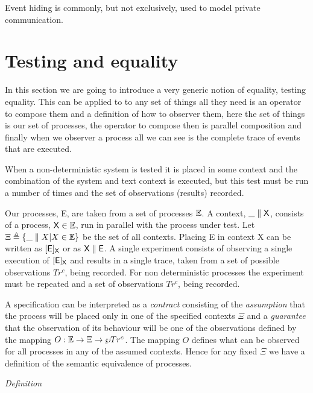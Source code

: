 \documentclass[]{article}
\begin{document}
Event hiding is commonly, but not exclusively,   used to model private  communication.

\section{Testing and equality}
In this section we are going to introduce  a very generic notion of equality, testing equality. This can be applied to to any set of things all they need is an operator to compose them and a definition of how to observer them, here the set of things is our set of processes, the operator to compose then is parallel composition and finally when we observer a process all we can see is the complete trace of events that are executed.

When a non-deterministic system is tested it is placed in some context and the combination of the system and text context is executed, but this test must be run a number of times and the set of observations (results) recorded.


Our processes, {\sf E},  are taken from a set of processes $\mathbb E$. A context, ${\sf \_\parallel X}$, consists of a process, ${\sf X}\in \mathbb E$,  run in parallel with the process under test. Let  $\Xi\triangleq \{\_\parallel X | X\in \Emath\}$ be  the set of all contexts.
Placing  {\sf E} in context {\sf X} can be   written as  $[{\sf E}]_{\sf X}$ or as ${\sf X\parallel E}$.   A single experiment consists of observing a single execution of $[{\sf E}]_{\sf X}$ and  results in a single trace, taken from a set of possible observations $Tr^c$, being recorded.
For non deterministic processes the experiment must be repeated and a set of observations $Tr^c$, being recorded.

A specification can be  interpreted as a \emph{contract} consisting of the \emph{assumption} that the process will be placed only in one of the specified contexts $\Xi$ and a \emph{guarantee} that the observation of its behaviour will be one of the observations defined by the mapping $O: \mathbb E \rightarrow\Xi\rightarrow \wp Tr^c$.  The mapping $O$ defines what can be observed  for all processes in any of the assumed contexts. Hence for any fixed $\Xi$  we have a definition of the semantic equivalence of processes.

\emph{Definition}
\end{document}
